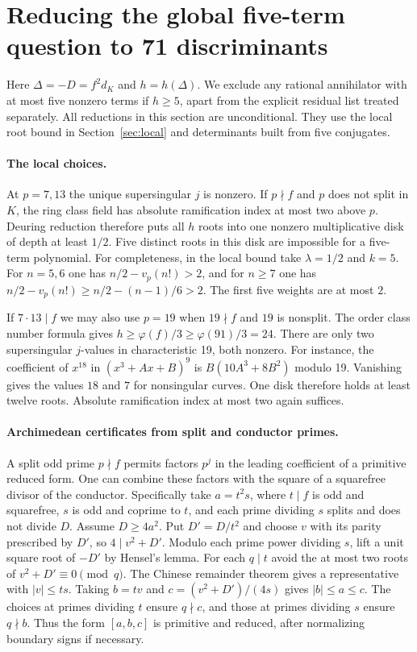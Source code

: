 \section{Reducing the global five-term question to 71 discriminants}\label{sec:global-five}
Here $\Delta=-D=f^2d_K$ and $h=h(\Delta)$. We exclude any rational
annihilator with at most five nonzero terms if $h\ge5$, apart from the
explicit residual list treated separately. All reductions in this
section are unconditional. They use the local root bound in Section~\ref{sec:local} and determinants built from five conjugates.

\paragraph{The local choices.}
At $p=7,13$ the unique supersingular $j$ is nonzero. If $p\nmid f$
and $p$ does not split in $K$, the ring class field has absolute
ramification index at most two above $p$. Deuring reduction therefore
puts all $h$ roots into one nonzero multiplicative disk of depth
at least $1/2$. Five distinct roots in this disk are impossible for a
five-term polynomial. For completeness, in the local bound take
$\lambda=1/2$ and $k=5$. For $n=5,6$ one has
$n/2-v_p(n!)>2$, and for $n\ge7$ one has
$n/2-v_p(n!)\ge n/2-(n-1)/6>2$.
The first five weights are at most $2$.

If $7\cdot13\mid f$ we may also use $p=19$ when $19\nmid f$ and $19$
is nonsplit. The order class number formula gives
$h\ge\varphi(f)/3\ge\varphi(91)/3=24$.
There are only two supersingular $j$-values in characteristic 19, both
nonzero. For instance, the coefficient of $x^{18}$ in
$(x^3+Ax+B)^9$ is $B(10A^3+8B^2)$ modulo 19. Vanishing gives the
values $18$ and $7$ for nonsingular curves. One disk therefore holds
at least twelve roots. Absolute ramification index at most two again
suffices.

\paragraph{Archimedean certificates from split and conductor primes.}
A split odd prime $p\nmid f$ permits factors $p^j$ in the leading
coefficient of a primitive reduced form. One can combine these
factors with the square of a squarefree divisor of the conductor.
Specifically take $a=t^2s$, where $t\mid f$ is odd and squarefree,
$s$ is odd and coprime to $t$, and each prime dividing $s$ splits and
does not divide $D$. Assume $D\ge4a^2$. Put $D'=D/t^2$ and choose
$v$ with its parity prescribed by $D'$, so $4\mid v^2+D'$.
Modulo each prime power dividing $s$, lift a unit square root of $-D'$
by Hensel's lemma. For each $q\mid t$ avoid the at most two roots
of $v^2+D'\equiv0\pmod q$. The Chinese remainder theorem gives a
representative with $|v|\le ts$. Taking $b=tv$ and
$c=(v^2+D')/(4s)$ gives $|b|\le a\le c$. The choices at primes dividing
$t$ ensure $q\nmid c$, and those at primes dividing $s$ ensure
$q\nmid b$. Thus the form $[a,b,c]$ is primitive and reduced,
after normalizing boundary signs if necessary.

